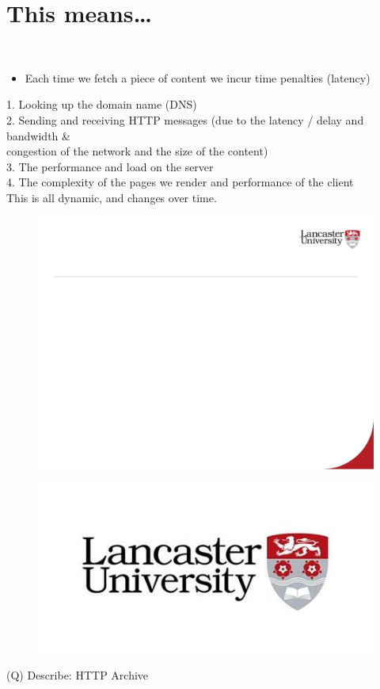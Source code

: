 \documentclass[12pt]{article}
\begin{document}
\section{This means…}
\\
\begin{itemize}
  \item Each time we fetch a piece of content we incur time penalties (latency)
\end{itemize}
1. Looking up the domain name (DNS)\\
2. Sending and receiving HTTP messages (due to the latency / delay and bandwidth \& \\
congestion of the network and the size of the content)\\
3. The performance and load on the server\\
4. The complexity of the pages we render and performance of the client\\
This is all dynamic, and changes over time.\\
\begin{figure}[H]
\includegraphics[width=0.5\linewidth]{page34-image-1.png}
\end{figure}
\begin{figure}[H]
\includegraphics[width=0.5\linewidth]{page34-image-2.png}
\end{figure}
\clearpage
(Q)
Describe: HTTP Archive 
\clearpage
\end{document}
